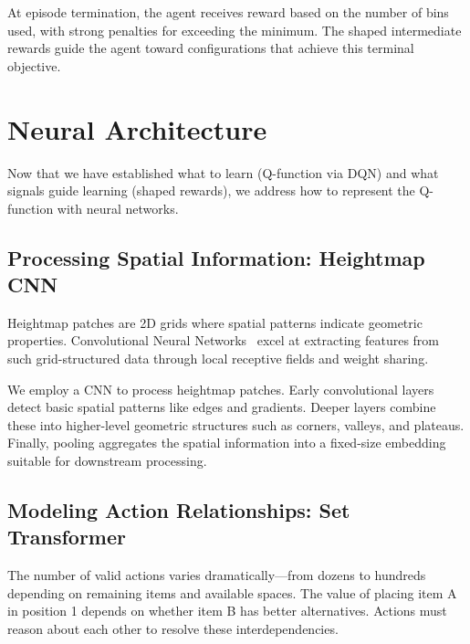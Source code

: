 At episode termination, the agent receives reward based on the number of bins used, with strong penalties for exceeding the minimum. The shaped intermediate rewards guide the agent toward configurations that achieve this terminal objective.

\section{Neural Architecture}

Now that we have established what to learn (Q-function via DQN) and what signals guide learning (shaped rewards), we address how to represent the Q-function with neural networks.

\subsection{Processing Spatial Information: Heightmap CNN}

Heightmap patches are 2D grids where spatial patterns indicate geometric properties. Convolutional Neural Networks~\cite{lecun1998gradient} excel at extracting features from such grid-structured data through local receptive fields and weight sharing.

We employ a CNN to process heightmap patches. Early convolutional layers detect basic spatial patterns like edges and gradients. Deeper layers combine these into higher-level geometric structures such as corners, valleys, and plateaus. Finally, pooling aggregates the spatial information into a fixed-size embedding suitable for downstream processing.


\subsection{Modeling Action Relationships: Set Transformer}

The number of valid actions varies dramatically---from dozens to hundreds depending on remaining items and available spaces. The value of placing item A in position 1 depends on whether item B has better alternatives. Actions must reason about each other to resolve these interdependencies.

